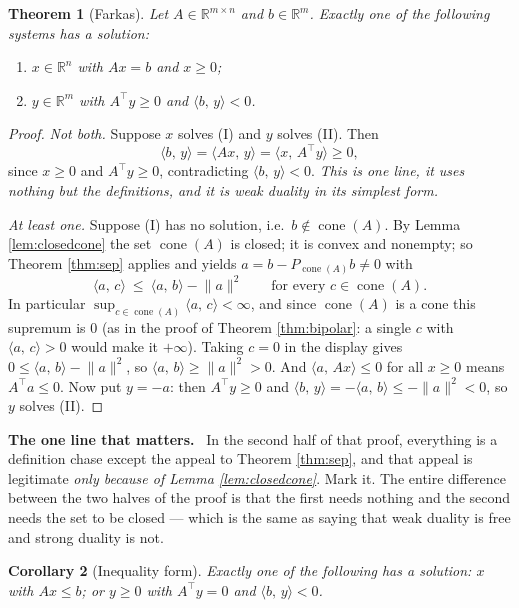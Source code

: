 \documentclass[11pt,a4paper]{article}
\newcommand{\mpart}[1]{\smallskip\noindent\textbf{#1}\ \ignorespaces}
\theoremstyle{definition}
\theoremstyle{plain}
\newtheorem{theorem}{Theorem}
\newtheorem{corollary}[theorem]{Corollary}
\theoremstyle{remark}
\newcommand{\R}{\mathbb{R}}
\newcommand{\ip}[2]{\langle #1,\, #2\rangle}
\newcommand{\norm}[1]{\lVert #1\rVert}
\newcommand{\proj}{P}
\DeclareMathOperator{\cone}{cone}
\begin{document}
\begin{theorem}[Farkas]
\label{thm:farkas}
Let $A\in\R^{m\times n}$ and $b\in\R^m$. Exactly one of the following systems has a solution:
\begin{enumerate}
\item[(I)] $x\in\R^n$ with $Ax=b$ and $x\ge0$;
\item[(II)] $y\in\R^m$ with $A^\top y\ge0$ and $\ip{b}{y}<0$.
\end{enumerate}
\end{theorem}

\begin{proof}
\emph{Not both.} Suppose $x$ solves (I) and $y$ solves (II). Then
\[
\ip{b}{y}=\ip{Ax}{y}=\ip{x}{A^\top y}\ge0 ,
\]
since $x\ge0$ and $A^\top y\ge0$, contradicting $\ip{b}{y}<0$. \emph{This is one line, it uses
nothing but the definitions, and it is weak duality in its simplest form.}

\emph{At least one.} Suppose (I) has no solution, i.e.\ $b\notin\cone(A)$. By Lemma
\ref{lem:closedcone} the set $\cone(A)$ is closed; it is convex and nonempty; so Theorem
\ref{thm:sep} applies and yields $a=b-\proj_{\cone(A)}b\ne0$ with
\[
\ip{a}{c}\ \le\ \ip{a}{b}-\norm a^2\qquad\text{for every }c\in\cone(A) .
\]
In particular $\sup_{c\in\cone(A)}\ip{a}{c}<\infty$, and since $\cone(A)$ is a cone this
supremum is $0$ (as in the proof of Theorem \ref{thm:bipolar}: a single $c$ with
$\ip{a}{c}>0$ would make it $+\infty$). Taking $c=0$ in the display gives
$0\le\ip{a}{b}-\norm a^2$, so $\ip{a}{b}\ge\norm a^2>0$. And $\ip{a}{Ax}\le0$ for all $x\ge0$
means $A^\top a\le0$. Now put $y=-a$: then $A^\top y\ge0$ and
$\ip{b}{y}=-\ip{a}{b}\le-\norm a^2<0$, so $y$ solves (II).
\end{proof}

\mpart{The one line that matters.} In the second half of that proof, everything is a definition
chase except the appeal to Theorem \ref{thm:sep}, and that appeal is legitimate \emph{only
because of Lemma \ref{lem:closedcone}}. Mark it. The entire difference between the two halves of
the proof is that the first needs nothing and the second needs the set to be closed --- which is
the same as saying that weak duality is free and strong duality is not.

\begin{corollary}[Inequality form]
\label{cor:farkasineq}
Exactly one of the following has a solution: $x$ with $Ax\le b$; or $y\ge0$ with $A^\top y=0$
and $\ip{b}{y}<0$.
\end{corollary}
\end{document}
